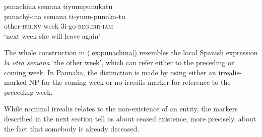\ea\label{ex:punachina}
\begingl 
\glpreamble punachina semana tiyunupunukatu\\
\gla punachÿ-ina semana ti-yunu-punuka-tu\\ 
\glb other-\textsc{irr.nv} week 3i-go-\textsc{reg.irr}-\textsc{iam}\\ 
\glft ‘next week she will leave again’\\ 
\endgl
\trailingcitation{[mxx-d110813s-2.043]}
\xe

The whole construction in (\ref{ex:punachina}) resembles the local Spanish expression \textit{la otra semana} ‘the other week’, which can refer either to the preceding or coming week. In Paunaka, the distinction is made by using either an irrealis-marked NP for the coming week or no irrealis marker for reference to the preceding week.

While nominal irrealis relates to the non-existence of an entity, the markers described in the next section tell us about ceased existence, more precisely, about the fact that somebody is already deceased.

